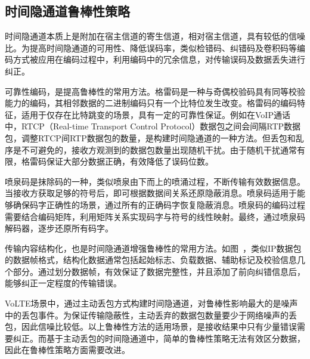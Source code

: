\subsection{时间隐通道鲁棒性策略}
\label{sec:intro:background:robustness}

时间隐通道本质上是附加在宿主信道的寄生信道，相对宿主信道，具有较低的信噪比。为提高时间隐通道的可用性、降低误码率，类似检错码、纠错码及卷积码等编码方式被应用在编码过程中，利用编码中的冗余信息，对传输误码及数据丢失进行纠正。

可靠性编码，是提高鲁棒性的常用方法。格雷码是一种与奇偶校验码具有同等校验能力的编码，其相邻数据的二进制编码只有一个比特位发生改变。格雷码的编码特征，适用于仅存在比特跳变的场景，具有一定的可靠性保证。例如在VoIP通话中，RTCP（Real-time Transport Control Protocol）数据包之间会间隔RTP数据包，调整RTCP间RTP数据包的数量，是构建时间隐通道的一种方法。但丢包和乱序是不可避免的，接收方观测到的数据包数量出现随机干扰。由于随机干扰通常有限，格雷码保证大部分数据正确，有效降低了误码位数。

喷泉码是抹除码的一种，类似喷泉由下而上的喷涌过程，不断传输有效数据信息。当接收方获取足够的符号后，即可根据数据间关系还原隐蔽消息。喷泉码适用于能够确保码字正确性的场景，通过所有的正确码字恢复隐蔽消息。喷泉码的编码过程需要结合编码矩阵，利用矩阵关系实现码字与符号的线性映射。最终，通过喷泉码解码器，逐步还原所有码字。


传输内容结构化，也是时间隐通道增强鲁棒性的常用方法。如图\ ，类似IP数据包的数据帧格式，结构化数据通常包括起始标志、负载数据、辅助标记及校验信息几个部分。通过划分数据帧，有效保证了数据完整性，并且添加了前向纠错信息后，能够纠正一定程度的传输错误。

VoLTE场景中，通过主动丢包方式构建时间隐通道，对鲁棒性影响最大的是噪声中的丢包事件。为保证传输隐蔽性，主动丢弃的数据包数量要少于网络噪声的丢包，因此信噪比较低。以上鲁棒性方法的适用场景，是接收结果中只有少量错误需要纠正。而基于主动丢包的时间隐通道中，简单的鲁棒性策略无法有效区分数据，因此在鲁棒性策略方面需要改进。

